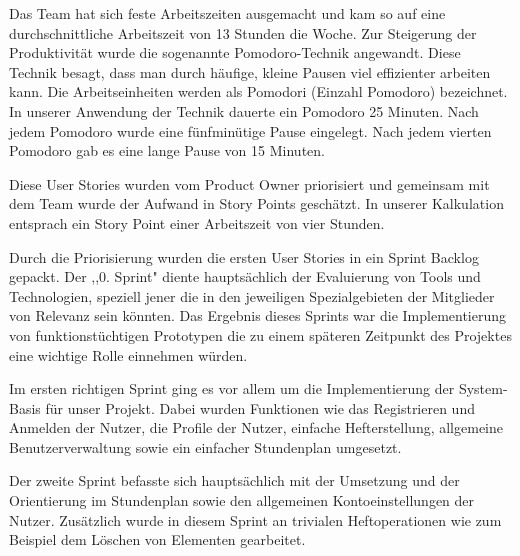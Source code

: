 
Das Team hat sich feste Arbeitszeiten ausgemacht und kam so auf eine durchschnittliche Arbeitszeit von 13 Stunden die Woche. Zur Steigerung der Produktivität wurde die sogenannte Pomodoro-Technik angewandt. Diese Technik besagt, dass man durch häufige, kleine Pausen viel effizienter arbeiten kann. Die Arbeitseinheiten werden als Pomodori (Einzahl Pomodoro) bezeichnet. In unserer Anwendung der Technik dauerte ein Pomodoro 25 Minuten. Nach jedem Pomodoro wurde eine fünfminütige Pause eingelegt. Nach jedem vierten Pomodoro gab es eine lange Pause von 15 Minuten.


Diese User Stories wurden vom Product Owner priorisiert und gemeinsam mit dem Team wurde der Aufwand in Story Points geschätzt. In unserer Kalkulation entsprach ein Story Point einer Arbeitszeit von vier Stunden. 

Durch die Priorisierung wurden die ersten User Stories in ein Sprint Backlog gepackt. Der ,,0. Sprint" diente hauptsächlich der Evaluierung von Tools und Technologien, speziell jener die in den jeweiligen Spezialgebieten der Mitglieder von Relevanz sein könnten. Das Ergebnis dieses Sprints war die Implementierung von funktionstüchtigen Prototypen die zu einem späteren Zeitpunkt des Projektes eine wichtige Rolle einnehmen würden.


Im ersten richtigen Sprint ging es vor allem um die Implementierung der System-Basis für unser Projekt. Dabei wurden Funktionen wie das Registrieren und Anmelden der Nutzer, die Profile der Nutzer, einfache Hefterstellung, allgemeine Benutzerverwaltung sowie ein einfacher Stundenplan umgesetzt.


Der zweite Sprint befasste sich hauptsächlich mit der Umsetzung und der Orientierung im Stundenplan sowie den allgemeinen Kontoeinstellungen der Nutzer. Zusätzlich wurde in diesem Sprint an trivialen Heftoperationen wie zum Beispiel dem Löschen von Elementen gearbeitet.

